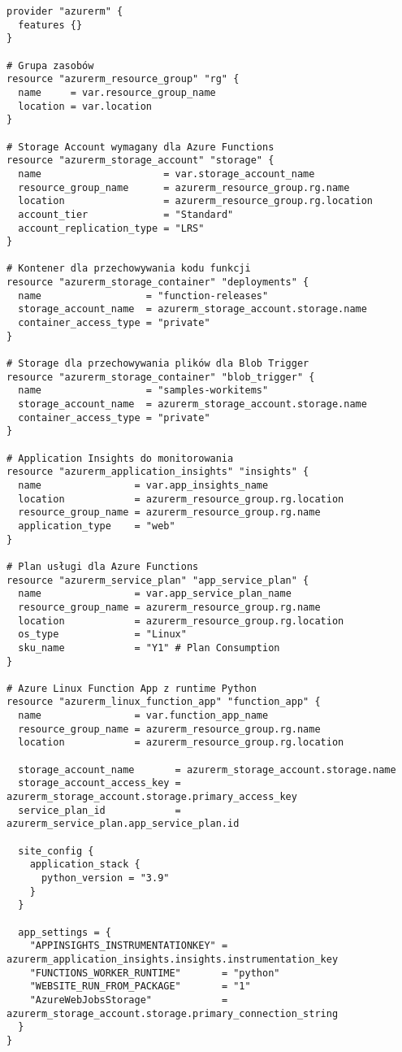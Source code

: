 \documentclass{article}
\begin{document}
\begin{lstlisting}[language=HCL]
provider "azurerm" {
  features {}
}

# Grupa zasobów
resource "azurerm_resource_group" "rg" {
  name     = var.resource_group_name
  location = var.location
}

# Storage Account wymagany dla Azure Functions
resource "azurerm_storage_account" "storage" {
  name                     = var.storage_account_name
  resource_group_name      = azurerm_resource_group.rg.name
  location                 = azurerm_resource_group.rg.location
  account_tier             = "Standard"
  account_replication_type = "LRS"
}

# Kontener dla przechowywania kodu funkcji
resource "azurerm_storage_container" "deployments" {
  name                  = "function-releases"
  storage_account_name  = azurerm_storage_account.storage.name
  container_access_type = "private"
}

# Storage dla przechowywania plików dla Blob Trigger
resource "azurerm_storage_container" "blob_trigger" {
  name                  = "samples-workitems"
  storage_account_name  = azurerm_storage_account.storage.name
  container_access_type = "private"
}

# Application Insights do monitorowania
resource "azurerm_application_insights" "insights" {
  name                = var.app_insights_name
  location            = azurerm_resource_group.rg.location
  resource_group_name = azurerm_resource_group.rg.name
  application_type    = "web"
}

# Plan usługi dla Azure Functions
resource "azurerm_service_plan" "app_service_plan" {
  name                = var.app_service_plan_name
  resource_group_name = azurerm_resource_group.rg.name
  location            = azurerm_resource_group.rg.location
  os_type             = "Linux"
  sku_name            = "Y1" # Plan Consumption
}

# Azure Linux Function App z runtime Python
resource "azurerm_linux_function_app" "function_app" {
  name                = var.function_app_name
  resource_group_name = azurerm_resource_group.rg.name
  location            = azurerm_resource_group.rg.location

  storage_account_name       = azurerm_storage_account.storage.name
  storage_account_access_key = azurerm_storage_account.storage.primary_access_key
  service_plan_id            = azurerm_service_plan.app_service_plan.id
  
  site_config {
    application_stack {
      python_version = "3.9"
    }
  }

  app_settings = {
    "APPINSIGHTS_INSTRUMENTATIONKEY" = azurerm_application_insights.insights.instrumentation_key
    "FUNCTIONS_WORKER_RUNTIME"       = "python"
    "WEBSITE_RUN_FROM_PACKAGE"       = "1"
    "AzureWebJobsStorage"            = azurerm_storage_account.storage.primary_connection_string
  }
}
\end{lstlisting}
\end{document}
